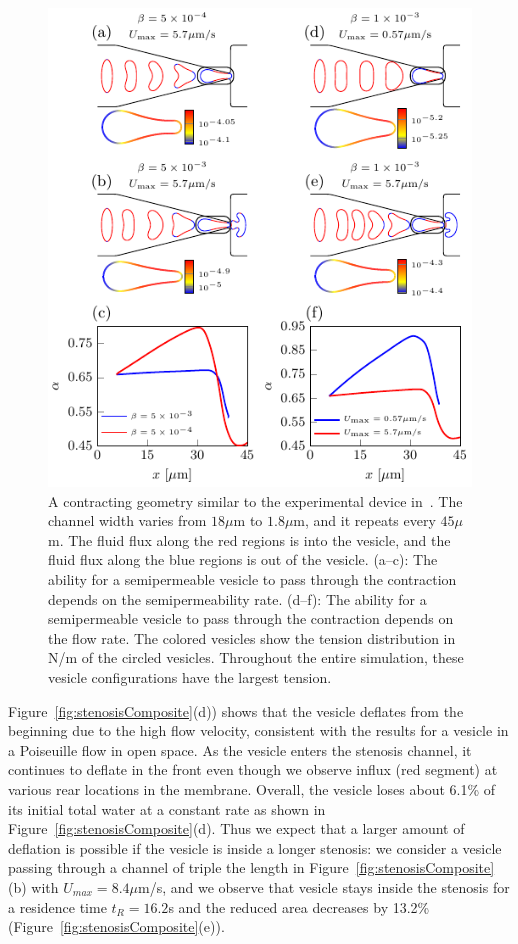 \documentclass[9pt,twocolumn,twoside,lineno]{pnas-new}
\newif\ifTikz
\begin{document}
\begin{figure}[htp]
  \centering
  \ifTikz
  
  \else
  \includegraphics{figures/contractingComposite.pdf}
  \fi
  \caption{\label{fig:contractingComposite} A contracting geometry
  similar to the experimental device in~\cite{wu2015critical}. The
  channel width varies from $18\mu$m to $1.8\mu$m, and it repeats every
  $45\mu$m. The fluid flux along the red regions is into the vesicle,
  and the fluid flux along the blue regions is out of the vesicle.
  (a--c): The ability for a semipermeable vesicle to pass through the
  contraction depends on the semipermeability rate. (d--f): The ability
  for a semipermeable vesicle to pass through the contraction depends
  on the flow rate. The colored vesicles show the tension distribution
  in N/m of the circled vesicles. Throughout the entire simulation,
  these vesicle configurations have the largest tension.}
\end{figure}

Figure~\ref{fig:stenosisComposite}(d)) shows that the vesicle deflates
from the beginning due to the high flow velocity, consistent with the
results for a vesicle in a Poiseuille flow in open space. As the vesicle
enters the stenosis channel, it continues to deflate in the front even
though we observe influx (red segment) at various rear locations in the
membrane. Overall, the vesicle loses about 6.1\% of its initial total
water at a constant rate as shown in
Figure~\ref{fig:stenosisComposite}(d). Thus we expect that a larger
amount of deflation is possible if the vesicle is inside a longer
stenosis: we consider a vesicle passing through a channel of triple the
length in Figure~\ref{fig:stenosisComposite}(b) with $U_{max}=8.4
\mu$m/s, and we observe that vesicle stays inside the stenosis for a
residence time $t_R=16.2$s and the reduced area decreases by 13.2\%
(Figure~\ref{fig:stenosisComposite}(e)).
\end{document}

